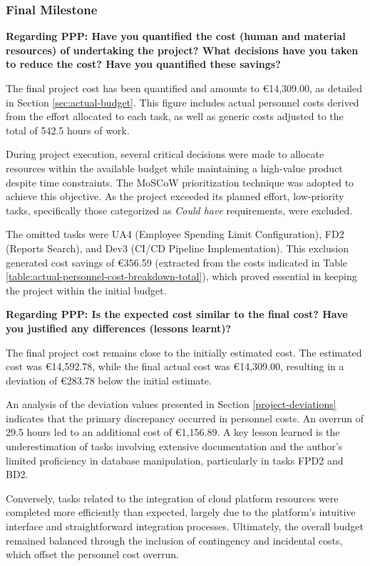 \subsubsection{Final Milestone}

\textbf{Regarding PPP: Have you quantified the cost (human and material resources) of undertaking the project? What decisions have you taken to reduce the cost? Have you quantified these savings?}

The final project cost has been quantified and amounts to €14,309.00, as detailed in Section \ref{sec:actual-budget}. This figure includes actual personnel costs derived from the effort allocated to each task, as well as generic costs adjusted to the total of 542.5 hours of work.

During project execution, several critical decisions were made to allocate resources within the available budget while maintaining a high-value product despite time constraints. The MoSCoW prioritization technique was adopted to achieve this objective. As the project exceeded its planned effort, low-priority tasks, specifically those categorized as \textit{Could have} requirements, were excluded.

The omitted tasks were UA4 (Employee Spending Limit Configuration), FD2 (Reports Search), and Dev3 (CI/CD Pipeline Implementation). This exclusion generated cost savings of €356.59 (extracted from the costs indicated in Table \ref{table:actual-personnel-cost-breakdown-total}), which proved essential in keeping the project within the initial budget.

\newpage

\textbf{Regarding PPP: Is the expected cost similar to the final cost? Have you justified any differences (lessons learnt)?}

The final project cost remains close to the initially estimated cost. The estimated cost was €14,592.78, while the final actual cost was €14,309.00, resulting in a deviation of €283.78 below the initial estimate.

An analysis of the deviation values presented in Section
\ref{project-deviations} indicates that the primary discrepancy occurred in personnel costs. An overrun of 29.5 hours led to an additional cost of €1,156.89. A key lesson learned is the underestimation of tasks involving extensive documentation and the author's limited proficiency in database manipulation, particularly in tasks FPD2 and BD2.

Conversely, tasks related to the integration of cloud platform resources were completed more efficiently than expected, largely due to the platform's intuitive interface and straightforward integration processes. Ultimately, the overall budget remained balanced through the inclusion of contingency and incidental costs, which offset the personnel cost overrun. 

